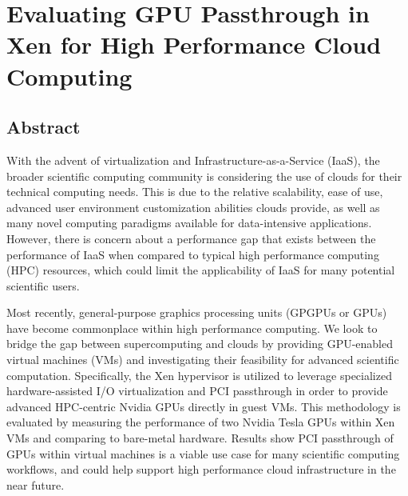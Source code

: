 
\chapter{Evaluating GPU Passthrough in Xen for High Performance Cloud Computing}
\label{chap:hpgc2014}



\section{Abstract}


With the advent of virtualization and Infrastructure-as-a-Service (IaaS), the broader scientific computing community is considering the use of clouds for their technical computing needs. This is due to the relative scalability, ease of use, advanced user environment customization abilities clouds provide, as well as many novel computing paradigms available for data-intensive applications. However, there is concern about a performance gap that exists between the performance of IaaS when compared to typical high performance computing (HPC) resources, which could limit the applicability of IaaS for many potential scientific users. 

Most recently, general-purpose graphics processing units (GPGPUs or GPUs) have become commonplace within high performance computing. We look to bridge the gap between supercomputing and clouds by providing GPU-enabled virtual machines (VMs) and investigating their feasibility for advanced scientific computation.  Specifically, the Xen hypervisor is utilized to leverage specialized hardware-assisted I/O virtualization and PCI passthrough in order to provide advanced HPC-centric Nvidia GPUs directly in guest VMs. This methodology is evaluated by measuring the performance of two Nvidia Tesla GPUs within Xen VMs and comparing to bare-metal hardware. Results show PCI passthrough of GPUs within virtual machines is a viable use case for many scientific computing workflows, and could help support high performance cloud infrastructure in the near future.



